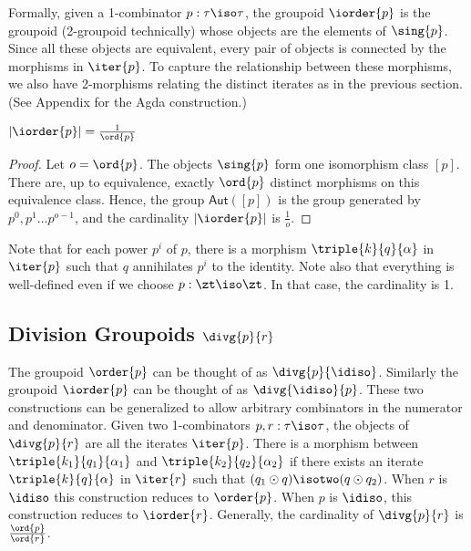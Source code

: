 Formally, given a 1-combinator $p : \tau\iso\tau$, the groupoid
$\iorder{p}$ is the groupoid (2-groupoid technically) whose objects
are the elements of $\sing{p}$. Since all these objects are
equivalent, every pair of objects is connected by the morphisms in
$\iter{p}$. To capture the relationship between these morphisms, we
also have 2-morphisms relating the distinct iterates as in the
previous section. (See Appendix for the Agda construction.)

\begin{lemma}
  $|\iorder{p}| = \frac{1}{\ord{p}}$
\end{lemma}
\begin{proof}
  Let $o = \ord{p}$. The objects $\sing{p}$ form one isomorphism class
  $[p]$. There are, up to equivalence, exactly $\ord{p}$ distinct
  morphisms on this equivalence class. Hence, the group
  $\textsf{Aut}([p])$ is the group generated by
  $p^0, p^1 \dots p^{o-1}$, and the cardinality
  $|\iorder{p}|$ is $\frac{1}{o}$.
\end{proof}

Note that for each power $p ^ i$ of $p$, there is a morphism
$\triple{k}{q}{\alpha}$ in $\iter{p}$ such that $q$ annihilates $p^i$
to the identity. Note also that everything is well-defined even if we
choose $p : \zt\iso\zt$. In that case, the cardinality is 1.

\subsection{Division Groupoids $\divg{p}{r}$}
   
The groupoid $\order{p}$ can be thought of as
$\divg{p}{\idiso}$. Similarly the groupoid $\iorder{p}$ can be thought
of as $\divg{\idiso}{p}$. These two constructions can be generalized
to allow arbitrary combinators in the numerator and denominator. Given
two 1-combinators $p, r : \tau\iso\tau$, the objects of $\divg{p}{r}$
are all the iterates $\iter{p}$. There is a morphism between
$\triple{k_1}{q_1}{\alpha_1}$ and $\triple{k_2}{q_2}{\alpha_2}$ if
there exists an iterate $\triple{k}{q}{\alpha}$ in $\iter{r}$ such
that $(q_1 \odot q) \isotwo (q \odot q_2)$. When $r$ is $\idiso$ this
construction reduces to $\order{p}$. When $p$ is $\idiso$, this
construction reduces to $\iorder{r}$. Generally, the cardinality of
$\divg{p}{r}$ is $\frac{\ord{p}}{\ord{r}}$. 


   

